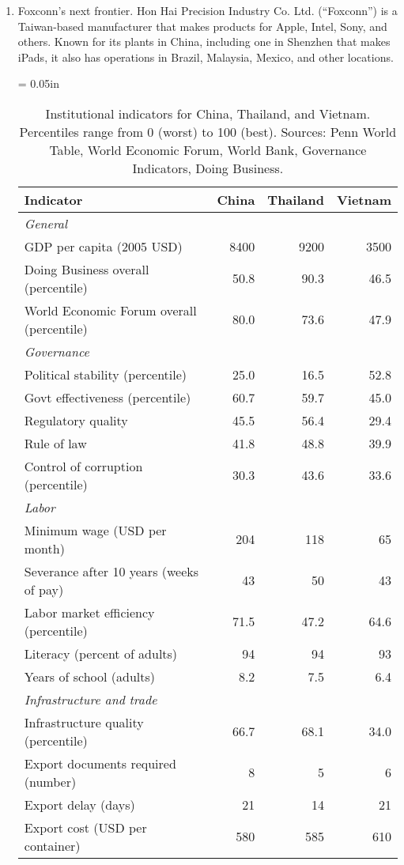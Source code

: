 \begin{enumerate}
\item Foxconn's next frontier.
Hon Hai Precision Industry Co. Ltd. (``Foxconn'') is a Taiwan-based manufacturer that makes
products for Apple, Intel, Sony, and others.
Known for its plants in China, including one in Shenzhen that makes iPads,
it also has operations in Brazil, Malaysia, Mexico, and other locations.


\begin{table}[ht]
\centering
\tabcolsep = 0.05in
\begin{tabular}{lrrr}
\toprule
Indicator & China & Thailand & Vietnam \\
\midrule
\multicolumn{2}{l}{\it General} \\
GDP per capita  (2005 USD) &  8400 & 9200 & 3500  \\
Doing Business overall (percentile) & 50.8  &90.3 & 46.5 \\
World Economic Forum overall (percentile) & 80.0 & 73.6 & 47.9\\
\midrule
\multicolumn{2}{l}{\it Governance} \\
Political stability (percentile)  &  25.0 & 16.5 & 52.8 \\
Govt effectiveness (percentile)   &  60.7 & 59.7 & 45.0 \\
Regulatory quality                & 45.5  & 56.4 & 29.4\\
Rule of law                       & 41.8 & 48.8 & 39.9 \\
Control of corruption (percentile) & 30.3 & 43.6 & 33.6  \\
\midrule
\multicolumn{2}{l}{\it Labor} \\
Minimum wage (USD per month) &  204 & 118 & 65 \\
Severance after 10 years (weeks of pay) & 43 & 50 & 43 \\
Labor market efficiency (percentile) & 71.5 & 47.2 & 64.6 \\
Literacy (percent of adults)        & 94 & 94 & 93 \\
Years of school (adults)        & 8.2 & 7.5 & 6.4 \\
\midrule
\multicolumn{2}{l}{\it Infrastructure and trade} \\
Infrastructure quality (percentile)  & 66.7 & 68.1 & 34.0 \\
Export documents required (number) & 8 & 5 & 6\\
Export delay (days) &  21 & 14 & 21  \\
Export cost (USD per container) &  580 & 585 & 610 \\
\bottomrule
\end{tabular}
\caption{Institutional indicators for China, Thailand, and Vietnam.
Percentiles range from 0 (worst) to 100 (best).
Sources:  Penn World Table, World Economic Forum, World Bank, Governance Indicators, Doing Business.}
\label{tab:ctv}
\end{table}


\end{enumerate}
